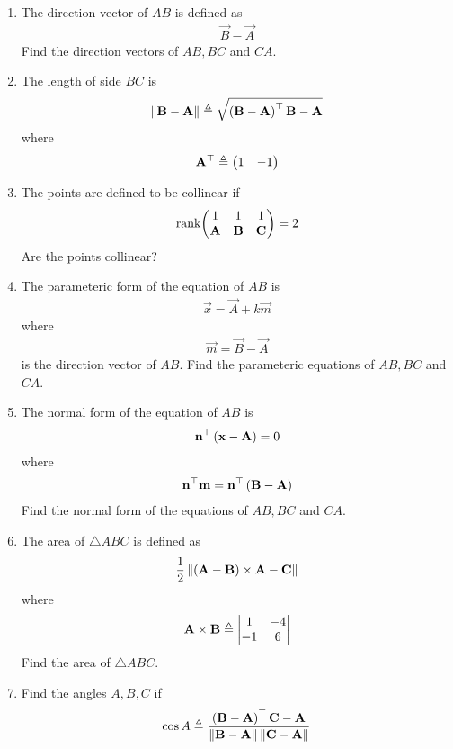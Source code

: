 \begin{enumerate}[label=\thesection.\arabic*.,ref=\thesection.\theenumi]
\item The direction vector of $AB$ is defined as
		\begin{align}
			\vec{B}-
			\vec{A}
		\end{align}
Find the direction vectors of $AB, BC$ and $CA$.
	\item The length of side $BC$ is 
		\begin{align}
			\left\lVert\mathbf{B}-\mathbf{A}\right\rVert \triangleq \sqrt{\left(\mathbf{B}-\mathbf{A}\right)^{\top}{\mathbf{B}-\mathbf{A}}}
		\end{align}
		where
		\begin{align}
			\mathbf{A}^{\top}\triangleq\begin{pmatrix}1 & -1\end{pmatrix}
		\end{align}
\item   The points are defined to be collinear if 
		\begin{align}
			\text{rank}{\ensuremath{\begin{pmatrix}1 & 1 & 1 \\ \mathbf{A}& \mathbf{B}&\mathbf{C}\end{pmatrix}}} = 2
		\end{align}
Are the points collinear?
\item The parameteric form of the equation  of $AB$ is 
		\begin{align}
			\vec{x}=\vec{A}+k\vec{m}
		\end{align}
		where
		\begin{align}
\vec{m}=\vec{B}-\vec{A}
		\end{align}
is the direction vector of $AB$.
Find the parameteric equations of $AB, BC$ and $CA$.
\item The normal form of the equation of $AB$  is 
		\begin{align}
			\mathbf{n}^{\top}\left(	\mathbf{x}-\mathbf{A}\right) = 0
		\end{align}
		where 
		\begin{align}
			\mathbf{n}^{\top}\mathbf{m}=\mathbf{n}^{\top}\left(\mathbf{B}-\mathbf{A}\right)
		\end{align}
Find the normal form of the equations of $AB, BC$ and $CA$.
\item The area of $\triangle ABC$ is defined as
		\begin{align}
			\frac{1}{2}\left\lVert{\ensuremath{\left(\mathbf{A}-\mathbf{B}\right)}\times {\mathbf{A}-\mathbf{C}}}\right\rVert
		\end{align}
		where
		\begin{align}
			\mathbf{A}\times\mathbf{B} \triangleq \begin{vmatrix}1 & -4 \\-1 & 6\end{vmatrix}
		\end{align}
		Find the area of $\triangle ABC$.
	\item Find the angles $A, B, C$ if 
    \label{prop:angle2d}
  \begin{align}
    \label{eq:angle2d}
			\cos A \triangleq 
\frac{\brak{\vec{B}-\vec{A}}^{\top}{\vec{C}-\vec{A}}}{\norm{\vec{B}-\vec{A}}\norm{\vec{C}-\vec{A}}}
  \end{align}
\end{enumerate}
